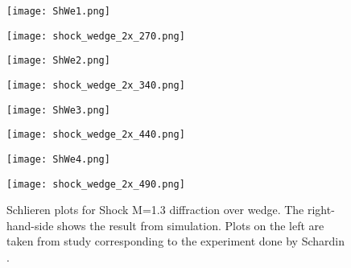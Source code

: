 \begin{figure}
    \centering

\begin{minipage}{0.49\textwidth}
  \texttt{[image: ShWe1.png]}
\end{minipage}
\begin{minipage}{0.49\textwidth}
  \texttt{[image: shock\_wedge\_2x\_270.png]}
\end{minipage}
\vspace{-10mm}

\begin{minipage}{0.49\textwidth}
  \texttt{[image: ShWe2.png]}
\end{minipage}
\begin{minipage}{0.49\textwidth}
  \texttt{[image: shock\_wedge\_2x\_340.png]}
\end{minipage}
\vspace{-10mm}

\begin{minipage}{0.49\textwidth}
  \texttt{[image: ShWe3.png]}
\end{minipage}
\begin{minipage}{0.49\textwidth}
  \texttt{[image: shock\_wedge\_2x\_440.png]}
\end{minipage}
\vspace{-10mm}

\begin{minipage}{0.49\textwidth}
  \texttt{[image: ShWe4.png]}
\end{minipage}
\begin{minipage}{0.49\textwidth}
  \texttt{[image: shock\_wedge\_2x\_490.png]}
\end{minipage}

    \caption[Shock diffraction over wedge]{Schlieren plots for Shock M=1.3 diffraction over wedge. The right-hand-side shows the result from simulation. Plots on the left are taken from study \cite{sivier1992vorticity} corresponding to the experiment done by Schardin \cite{schardin1966stossrohre}.}
    \label{fig:shockwedge}
\end{figure}

